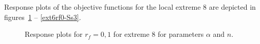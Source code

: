 \documentclass[review,times,3p,twocolumn,10pt]{elsarticle}
\begin{document}
Response plots of the objective functions for the local extreme 8 are depicted in figures~\ref{ext6rf0-an3} -- \ref{ext6rf0-Ss3}.

\begin{figure}[htb!]
\label{ext6rf0-an3}
\caption{Response plots for $r_f=0,1$ for extreme 8 for parameters $\alpha$ and $n$.}
\end{figure}
\end{document}
